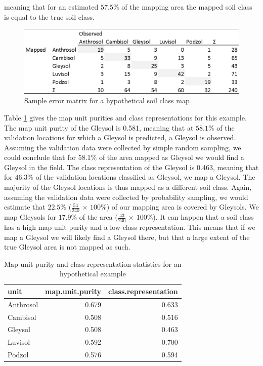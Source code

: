 \documentclass[10pt,b5paper,]{book}
\theoremstyle{definition}
\theoremstyle{definition}
\theoremstyle{definition}
\theoremstyle{remark}
\begin{document}
meaning that for an estimated \(57.5\%\) of the mapping area the mapped
soil class is equal to the true soil class.

\begin{figure}

{\centering \includegraphics[width=0.8\linewidth]{images/Validation_error_matrix2} 

}

\caption{Sample error matrix for a hypothetical soil class map}\label{fig:errormatrix2}
\end{figure}

Table \ref{tab:purity} gives the map unit purities and class
representations for this example. The map unit purity of the Gleysol is
0.581, meaning that at \(58.1\%\) of the validation locations for which
a Gleysol is predicted, a Gleysol is observed. Assuming the validation
data were collected by simple random sampling, we could conclude that
for \(58.1\%\) of the area mapped as Gleysol we would find a Gleysol in
the field. The class representation of the Gleysol is 0.463, meaning
that for \(46.3\%\) of the validation locations classified as Gleysol,
we map a Gleysol. The majority of the Gleysol locations is thus mapped
as a different soil class. Again, assuming the validation data were
collected by probability sampling, we would estimate that \(22.5\%\)
(\(\frac{54}{240}\) \(\times\) \(100\%\)) of our mapping area is covered
by Gleysols. We map Gleysols for \(17.9\%\) of the area
(\(\frac{43}{240}\) \(\times\) \(100\%\)). It can happen that a soil
class has a high map unit purity and a low-class representation. This
means that if we map a Gleysol we will likely find a Gleysol there, but
that a large extent of the true Gleysol area is not mapped as such.

\begin{table}

\caption{\label{tab:purity}Map unit purity and class representation statistics for an hypothetical example}
\centering
\begin{tabular}[t]{lrr}
\toprule
unit & map.unit.purity & class.representation\\
\midrule
Anthrosol & 0.679 & 0.633\\
Cambisol & 0.508 & 0.516\\
Gleysol & 0.508 & 0.463\\
Luvisol & 0.592 & 0.700\\
Podzol & 0.576 & 0.594\\
\bottomrule
\end{tabular}
\end{table}
\end{document}

